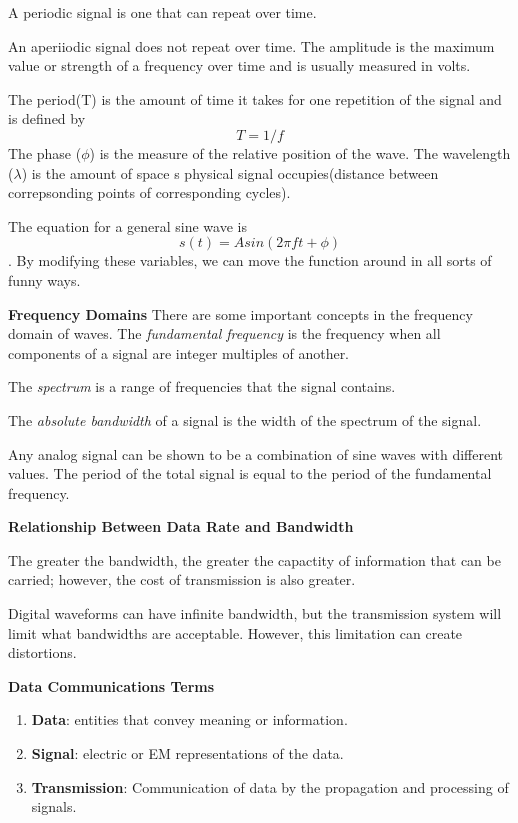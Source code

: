\documentclass{article}
\begin{document}
A periodic signal is one that can repeat over time.

An aperiiodic signal does not repeat over time. The amplitude is the maximum value or strength of a frequency over time and is 
usually measured in volts.

The period(T) is the amount of time it takes for one repetition of the signal and is defined by $$T = 1/f$$  
The phase ($\phi$)  is the measure of the relative position of the wave. The wavelength ($\lambda$) is the amount
of space s physical signal occupies(distance between correpsonding points of corresponding cycles).

The equation for a general sine wave is $$s(t)= Asin(2\pi ft + \phi)$$.
By modifying these variables, we can move the function around in all sorts of funny ways.

\hspace{10mm}\textbf{Frequency Domains}
There are some important concepts in the frequency domain of waves. The \textit{fundamental frequency} is the frequency when all
components of a signal are integer multiples of another.

The \textit{spectrum} is a range of frequencies that the signal contains.

The \textit{absolute bandwidth} of a signal is the width of the spectrum of the signal.

Any analog signal can be shown to be a combination of sine waves with different values. The period of the total signal is 
equal to the period of the fundamental frequency.

\hspace{10mm}\textbf{Relationship Between Data Rate and Bandwidth}

The greater the bandwidth, the greater the capactity of information that can be carried; however, the cost of transmission is 
also greater.

Digital waveforms can have infinite bandwidth, but the transmission system will limit what bandwidths are acceptable. 
However, this limitation can create distortions.

\hspace{10mm}\textbf{Data Communications Terms}
\begin{enumerate}
		\item{\textbf{Data}}: entities that convey meaning or information.
		\item{\textbf{Signal}}: electric or EM representations of the data.
		\item{\textbf{Transmission}}: Communication of data by the propagation and processing of signals.
\end{enumerate}
\end{document}
